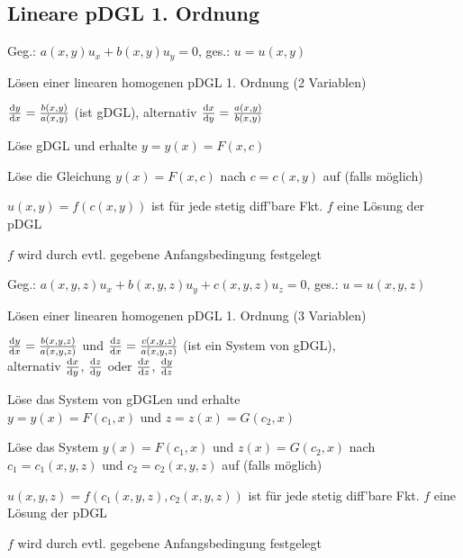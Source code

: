 \documentclass[german,color,5pt]{latex4ei/latex4ei_fs}
\begin{document}
\begin{sectionbox}
	\subsection{Lineare pDGL 1. Ordnung}
	Geg.: $a(x,y)u_x+b(x,y)u_y=0$, ges.: $u=u(x,y)$
	\begin{cookbox}{Lösen einer linearen homogenen pDGL 1. Ordnung (2 Variablen)}
		\item $\frac{\diff y}{\diff x}=\frac{b(x,y)}{a(x,y)}$ (ist gDGL), alternativ $\frac{\diff x}{\diff y}=\frac{a(x,y)}{b(x,y)}$ 
		\item Löse gDGL und erhalte $y=y(x)=F(x,c) $
		\item Löse die Gleichung $y(x)=F(x,c)$ nach $c = c(x,y)$ auf (falls möglich)
		\item $u(x,y)=f(c(x,y))$ ist für jede stetig diff'bare Fkt. $f$ eine Lösung der pDGL
		\item $f$ wird durch evtl. gegebene Anfangsbedingung festgelegt
	\end{cookbox}
	\label{subsubsec:linpdgl}
	Geg.: $a(x,y,z)u_x+b(x,y,z)u_y+c(x,y,z)u_z=0$, ges.: $u=u(x,y,z)$
	\begin{cookbox}{Lösen einer linearen homogenen pDGL 1. Ordnung (3 Variablen)}
		\item $\frac{\diff y}{\diff x}=\frac{b(x,y,z)}{a(x,y,z)}$ und $\frac{\diff z}{\diff x}=\frac{c(x,y,z)}{a(x,y,z)}$ (ist ein System von gDGL), \\
			alternativ $\frac{\diff x}{\diff y}$, $\frac{\diff z}{\diff y}$ oder $\frac{\diff x}{\diff z}$, $\frac{\diff y}{\diff z}$
		\item Löse das System von gDGLen und erhalte \\$y=y(x)=F(c_{1},x) $ und $z=z(x)=G(c_{2},x) $
		\item Löse das System $y(x)=F(c_{1},x) $ und $z(x)=G(c_{2},x) $ nach $c_{1}=c_{1}(x,y,z) $ und $c_{2}=c_{2}(x,y,z) $ auf (falls möglich)
		\item $ u(x,y,z)=f(c_{1}(x,y,z),c_{2}(x,y,z))$ ist für jede stetig diff'bare Fkt. $f$ eine Lösung der pDGL
		\item $f $ wird durch evtl. gegebene Anfangsbedingung festgelegt
	\end{cookbox}
\end{sectionbox}
\end{document}
